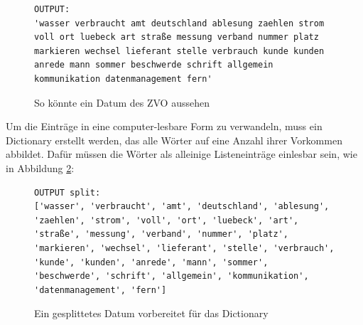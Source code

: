 \documentclass[german,version-2020-11]{uzl-thesis}
\begin{document}
\begin{figure}[h]
\begin{lstlisting}
OUTPUT: 
'wasser verbraucht amt deutschland ablesung zaehlen strom voll ort luebeck art straße messung verband nummer platz markieren wechsel lieferant stelle verbrauch kunde kunden anrede mann sommer beschwerde schrift allgemein kommunikation datenmanagement fern'
\end{lstlisting}
\caption{So könnte ein Datum des ZVO aussehen} 
\label{fig:data1}
\end{figure}

Um die Einträge in eine computer-lesbare Form zu verwandeln, muss ein Dictionary erstellt werden, das alle Wörter auf eine Anzahl ihrer Vorkommen abbildet. Dafür müssen die Wörter als alleinige Listeneinträge einlesbar sein, wie in Abbildung \ref{fig:data2}: 

\begin{figure}[h]
\begin{lstlisting}
OUTPUT split: 
['wasser', 'verbraucht', 'amt', 'deutschland', 'ablesung', 'zaehlen', 'strom', 'voll', 'ort', 'luebeck', 'art', 'straße', 'messung', 'verband', 'nummer', 'platz', 'markieren', 'wechsel', 'lieferant', 'stelle', 'verbrauch', 'kunde', 'kunden', 'anrede', 'mann', 'sommer', 'beschwerde', 'schrift', 'allgemein', 'kommunikation', 'datenmanagement', 'fern']
\end{lstlisting}
\caption{Ein gesplittetes Datum vorbereitet für das Dictionary}
\label{fig:data2}
\end{figure}
\end{document}
